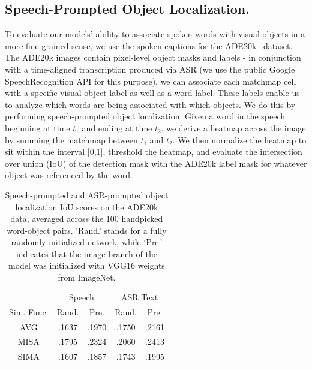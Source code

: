 \subsection{Speech-Prompted Object Localization.}
To evaluate our models' ability to associate spoken words with visual objects in a more fine-grained sense, we use the spoken captions for the ADE20k~\cite{ade20k} dataset. The ADE20k images contain pixel-level object masks and labels - in conjunction with a time-aligned transcription produced via ASR (we use the public Google SpeechRecognition API for this purpose), we can associate each matchmap cell with a specific visual object label as well as a word label. These labels enable us to analyze which words are being associated with which objects. We do this by performing speech-prompted object localization. Given a word in the speech beginning at time $t_1$ and ending at time $t_2$, we derive a heatmap across the image by summing the matchmap between $t_1$ and $t_2$. We then normalize the heatmap to sit within the interval [0,1], threshold the heatmap, and evaluate the intersection over union (IoU) of the detection mask with the ADE20k label mask for whatever object was referenced by the word.

\begin{table}
\centering
  \setlength\tabcolsep{3pt}
  \small
  \vspace{-.75cm}
  \caption[Speech-prompted and ASR-prompted object localization IoU score]{Speech-prompted and ASR-prompted object localization IoU scores on the ADE20k data, averaged across the 100 handpicked word-object pairs. `Rand.' stands for a fully randomly initialized network, while `Pre.' indicates that the image branch of the model was initialized with VGG16 weights from ImageNet.}
    \label{tab:IoU_scores}
  \begin{tabular}{ccccc}
    \toprule
    \multicolumn{1}{c}{} & \multicolumn{2}{c}{Speech} & \multicolumn{2}{c}{ASR Text} \\
	Sim. Func. & Rand. & Pre. & Rand. & Pre. \\
    \cmidrule(lr){2-3}\cmidrule(lr){4-5}
    \midrule
    AVG & .1637 & .1970 & .1750 & .2161 \\
    MISA & .1795 & .2324 & .2060 & .2413 \\
    SIMA & .1607 & .1857 & .1743 & .1995 \\
    \bottomrule
  \end{tabular}
\end{table}

